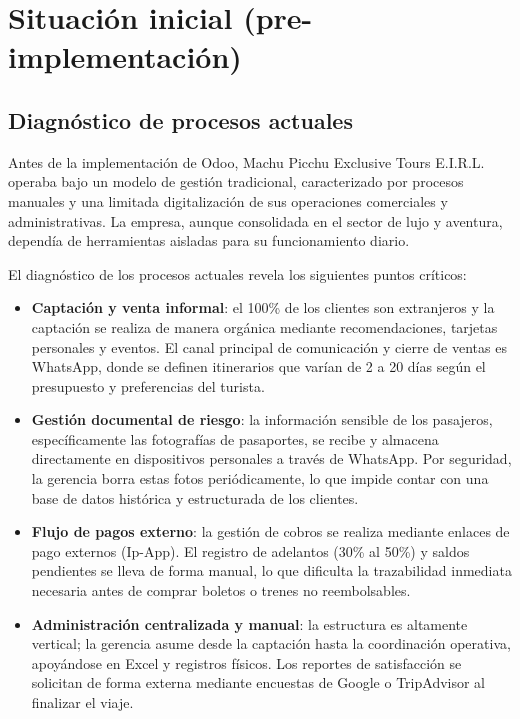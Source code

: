 \section{Situación inicial (pre-implementación)}

\subsection{Diagnóstico de procesos actuales}

\begin{indentedsubsection}
Antes de la implementación de Odoo, Machu Picchu Exclusive Tours E.I.R.L. operaba bajo un modelo de gestión tradicional, caracterizado por procesos manuales y una limitada digitalización de sus operaciones comerciales y administrativas. La empresa, aunque consolidada en el sector de lujo y aventura, dependía de herramientas aisladas para su funcionamiento diario.

El diagnóstico de los procesos actuales revela los siguientes puntos críticos:

\begin{itemize}
    \item[a.] \textbf{Captación y venta informal}: el 100\% de los clientes son extranjeros y la captación se realiza de manera orgánica mediante recomendaciones, tarjetas personales y eventos. El canal principal de comunicación y cierre de ventas es WhatsApp, donde se definen itinerarios que varían de 2 a 20 días según el presupuesto y preferencias del turista.
    \item[b.] \textbf{Gestión documental de riesgo}: la información sensible de los pasajeros, específicamente las fotografías de pasaportes, se recibe y almacena directamente en dispositivos personales a través de WhatsApp. Por seguridad, la gerencia borra estas fotos periódicamente, lo que impide contar con una base de datos histórica y estructurada de los clientes.
    \item[c.] \textbf{Flujo de pagos externo}: la gestión de cobros se realiza mediante enlaces de pago externos (Ip-App). El registro de adelantos (30\% al 50\%) y saldos pendientes se lleva de forma manual, lo que dificulta la trazabilidad inmediata necesaria antes de comprar boletos o trenes no reembolsables.
    \item[d.] \textbf{Administración centralizada y manual}: la estructura es altamente vertical; la gerencia asume desde la captación hasta la coordinación operativa, apoyándose en Excel y registros físicos. Los reportes de satisfacción se solicitan de forma externa mediante encuestas de Google o TripAdvisor al finalizar el viaje.
\end{itemize}

\end{indentedsubsection}

